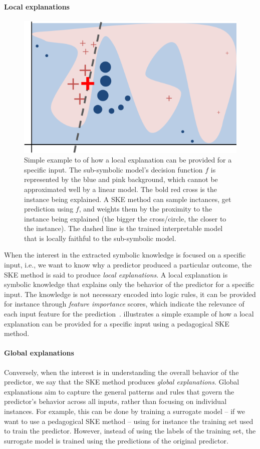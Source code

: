\paragraph{Local explanations}\label{par:local-explanations}
%
\begin{figure}
    \centering
    \includegraphics[width=.6\linewidth]{figures/local-explanation}
    \caption[Local explanations]{
        Simple example to of how a local explanation can be provided for a specific input.
        The sub-symbolic model's decision function $f$ is represented by the blue and pink background, which cannot be approximated well by a linear model.
        The bold red cross is the instance being explained.
        A \gls{SKE} method can sample inctances, get prediction using $f$, and weights them by the proximity to the instance being explained (the bigger the cross/circle, the closer to the instance).
        The dashed line is the trained interpretable model that is locally faithful to the sub-symbolic model.
    }
    \label{fig:local-explanations}
\end{figure}
%
When the interest in the extracted symbolic knowledge is focused on a specific input, i.e., we want to know why a predictor produced a particular outcome, the \gls{SKE} method is said to produce \emph{local explanations}.
%
A local explanation is symbolic knowledge that explains only the behavior of the predictor for a specific input.
%
The knowledge is not necessary encoded into logic rules, it can be provided for instance through \emph{feature importance} scores, which indicate the relevance of each input feature for the prediction~\cite{DBLP:conf/kdd/Ribeiro0G16}.
%
 illustrates a simple example of how a local explanation can be provided for a specific input using a pedagogical \gls{SKE} method.


\paragraph{Global explanations}\label{par:global-explanations}
%
Conversely, when the interest is in understanding the overall behavior of the predictor, we say that the \gls{SKE} method produces \emph{global explanations}.
%
Global explanations aim to capture the general patterns and rules that govern the predictor's behavior across all inputs, rather than focusing on individual instances.
%
For example, this can be done by training a surrogate model -- if we want to use a pedagogical \gls{SKE} method -- using for instance the training set used to train the predictor.
%
However, instead of using the labels of the training set, the surrogate model is trained using the predictions of the original predictor.


